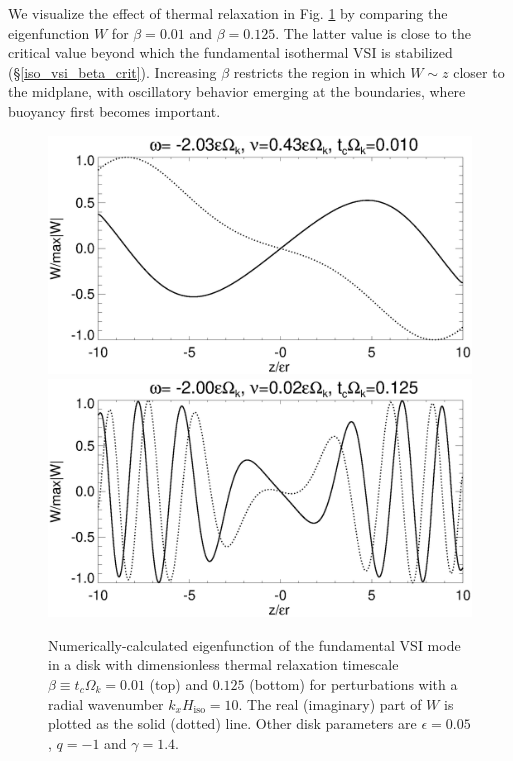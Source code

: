 We visualize the effect of thermal relaxation in 
Fig. \ref{relax_eigenW_num} by comparing the eigenfunction $W$ for
$\beta=0.01$ and $\beta=0.125$. The latter value is close to the critical
value beyond which the fundamental isothermal VSI is stabilized
(\S\ref{iso_vsi_beta_crit}).  Increasing $\beta$ restricts 
the region in which $W\sim z$ closer to the midplane, with oscillatory
behavior emerging at the boundaries, where buoyancy first becomes
important.  

\begin{figure}
  \includegraphics[width=\linewidth,clip=true,trim=0cm 1.75cm 0cm 0cm]{figures/eigenvectorW_beta0d01}
  \includegraphics[width=\linewidth,clip=true,trim=0cm 0cm 0cm 0cm]{figures/eigenvectorW_beta0d125}
  \caption{Numerically-calculated eigenfunction of the fundamental VSI
    mode in a disk with dimensionless thermal relaxation timescale
    $\beta \equiv t_c\Omega_k = 0.01$ (top) and $0.125$ (bottom) for
    perturbations with a radial wavenumber $k_xH_\mathrm{iso}=10$. The
    real (imaginary) part of $W$ is plotted as the solid (dotted)
    line. Other disk parameters are
    $\epsilon=0.05$, $q=-1$ and $\gamma=1.4$.
    \label{relax_eigenW_num}}  
\end{figure}

